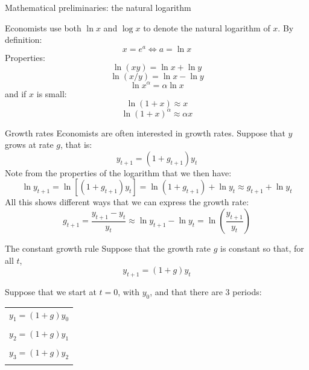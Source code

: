\documentclass[10pt]{beamer}
\begin{document}
\begin{frame}{Mathematical preliminaries: the natural logarithm}

Economists use both {\color{red}$\ln x$} and {\color{red}$\log x$} to denote the natural logarithm of $x$. By definition:
\begin{equation*}
x=e^a \Leftrightarrow a=\ln x
\end{equation*}
\smallskip
\noindent Properties:
\begin{equation*}
\ln (xy) = \ln x + \ln y
\end{equation*}
\begin{equation*}
\ln (x/y) = \ln x - \ln y
\end{equation*}
\begin{equation*}
\ln x^\alpha = \alpha \ln x
\end{equation*}
and if $x$ is small:
\begin{equation*}
\ln (1+x) \approx x
\end{equation*}
\begin{equation*}
\ln (1+x)^\alpha \approx \alpha x    
\end{equation*}
\end{frame}


\begin{frame}{Growth rates}
Economists are often interested in growth rates. Suppose that $y$ grows at rate $g$, that is:
\begin{equation*}
    y_{t+1}=(1+g_{t+1})y_t
\end{equation*}\smallskip
Note from the properties of the logarithm that we then have:
\begin{equation*}
    \ln{y_{t+1}} = \ln{[(1+g_{t+1})y_t]} = \ln{(1+g_{t+1})} + \ln{y_t} \approx g_{t+1} + \ln{y_t}
\end{equation*}\smallskip
All this shows different ways that we can express the growth rate:
\begin{equation*}
    g_{t+1} = \frac{y_{t+1}-y_t}{y_t} \approx \ln{y_{t+1}}-\ln{y_t} = \ln{\left(\frac{y_{t+1}}{y_t}\right)}
\end{equation*}
\end{frame}


\begin{frame}{The constant growth rule}
Suppose that the growth rate $g$ is constant so that, for all $t$,
\[
y_{t+1}=(1+g)y_t
\]

Suppose that we start at $t=0$, with $y_0$, and that there are $3$ periods: \medskip
\begin{tabular}{r}
\\
  $y_1=(1+g)y_0$\\
  \\
  $y_2=(1+g)y_1$\\
  \\
  $y_3=(1+g)y_2$\\
\\
\end{tabular}
\end{frame}
\end{document}
